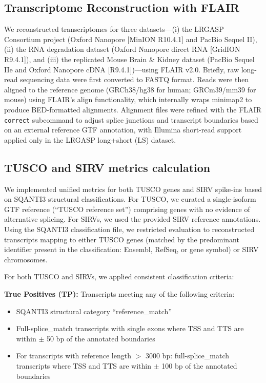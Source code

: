 \documentclass[pdflatex,sn-nature]{sn-jnl}%
\begin{document}
\subsection{Transcriptome Reconstruction with FLAIR}

We reconstructed transcriptomes for three datasets---(i) the LRGASP Consortium project (Oxford Nanopore [MinION R10.4.1] and PacBio Sequel II), (ii) the RNA degradation dataset (Oxford Nanopore direct RNA [GridION R9.4.1]), and (iii) the replicated Mouse Brain \& Kidney dataset (PacBio Sequel IIe and Oxford Nanopore cDNA [R9.4.1])---using FLAIR v2.0\cite{Tang2024FLAIR2}. Briefly, raw long-read sequencing data were first converted to FASTQ format. Reads were then aligned to the reference genome (GRCh38/hg38 for human; GRCm39/mm39 for mouse) using FLAIR's align functionality, which internally wraps minimap2 to produce BED-formatted alignments. Alignment files were refined with the FLAIR \texttt{correct} subcommand to adjust splice junctions and transcript boundaries based on an external reference GTF annotation, with Illumina short-read support applied only in the LRGASP long+short (LS) dataset.

\subsection{TUSCO and SIRV metrics calculation}

We implemented unified metrics for both TUSCO genes and SIRV spike-ins based on SQANTI3 structural classifications. For TUSCO, we curated a single-isoform GTF reference (``TUSCO reference set'') comprising genes with no evidence of alternative splicing. For SIRVs, we used the provided SIRV reference annotations. Using the SQANTI3 classification file, we restricted evaluation to reconstructed transcripts mapping to either TUSCO genes (matched by the predominant identifier present in the classification: Ensembl, RefSeq, or gene symbol) or SIRV chromosomes.

For both TUSCO and SIRVs, we applied consistent classification criteria:

\textbf{True Positives (TP):} Transcripts meeting any of the following criteria:
\begin{itemize}
  \item SQANTI3 structural category ``reference\_match''
  \item Full-splice\_match transcripts with single exons where TSS and TTS are within $\pm$ 50 bp of the annotated boundaries
  \item For transcripts with reference length $>$ 3000 bp: full-splice\_match transcripts where TSS and TTS are within $\pm$ 100 bp of the annotated boundaries
\end{itemize}
\end{document}
